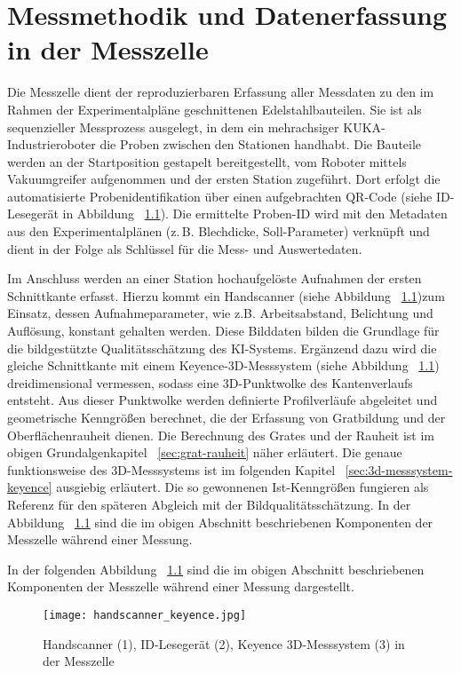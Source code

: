 \chapter{Messmethodik und Datenerfassung in der Messzelle}

Die Messzelle dient der reproduzierbaren Erfassung aller Messdaten zu den im Rahmen der Experimentalpläne geschnittenen Edelstahlbauteilen. Sie ist als sequenzieller Messprozess ausgelegt, in dem ein mehrachsiger KUKA-Industrieroboter die Proben zwischen den Stationen handhabt. Die Bauteile werden an der Startposition gestapelt bereitgestellt, vom Roboter mittels Vakuumgreifer aufgenommen und der ersten Station zugeführt. Dort erfolgt die automatisierte Probenidentifikation über einen aufgebrachten QR-Code (siehe ID-Lesegerät in Abbildung ~\ref{fig:handscanner_barcodelesegerät_keyence}). Die ermittelte Proben-ID wird mit den Metadaten aus den Experimentalplänen (z.\,B. Blechdicke, Soll-Parameter) verknüpft und dient in der Folge als Schlüssel für die Mess- und Auswertedaten.

Im Anschluss werden an einer Station hochaufgelöste Aufnahmen der ersten Schnittkante erfasst. Hierzu kommt ein Handscanner (siehe Abbildung ~\ref{fig:handscanner_barcodelesegerät_keyence})zum Einsatz, dessen Aufnahmeparameter, wie z.B. Arbeitsabstand, Belichtung und  Auflösung, konstant gehalten werden. Diese Bilddaten bilden die Grundlage für die bildgestützte Qualitätsschätzung des KI-Systems. Ergänzend dazu wird die gleiche Schnittkante mit einem Keyence-3D-Messsystem (siehe Abbildung ~\ref{fig:handscanner_barcodelesegerät_keyence}) dreidimensional vermessen, sodass eine 3D-Punktwolke des Kantenverlaufs entsteht. Aus dieser Punktwolke werden definierte Profilverläufe abgeleitet und geometrische Kenngrößen berechnet, die der Erfassung von Gratbildung und der Oberflächenrauheit dienen. Die Berechnung des Grates und der Rauheit ist im obigen Grundalgenkapitel ~\ref{sec:grat-rauheit} näher erläutert. Die genaue funktionsweise des 3D-Messsystems ist im folgenden Kapitel ~\ref{sec:3d-messsystem-keyence} ausgiebig erläutert. Die so gewonnenen Ist-Kenngrößen fungieren als Referenz für den späteren Abgleich mit der Bildqualitätsschätzung. In der Abbildung ~\ref{fig:handscanner_barcodelesegerät_keyence} sind die im obigen Abschnitt beschriebenen Komponenten der Messzelle während einer Messung.

In der folgenden Abbildung ~\ref{fig:handscanner_barcodelesegerät_keyence} sind die im obigen Abschnitt beschriebenen Komponenten der Messzelle während einer Messung dargestellt.
\begin{figure}[htbp]
    \centering
    \texttt{[image: handscanner\_keyence.jpg]}
    \caption{Handscanner (1), ID-Lesegerät (2), Keyence 3D-Messsystem (3) in der Messzelle}
    \label{fig:handscanner_barcodelesegerät_keyence}
\end{figure}

